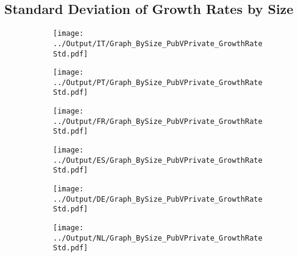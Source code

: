\documentclass[12pt,notitlepage]{article}
\begin{document}
\subsection{Standard Deviation of Growth Rates by Size}
\begin{figure}[!htpb]
\centering
\begin{subfigure}{.49\textwidth}
    \centering
 \texttt{[image: ../Output/IT/Graph\_BySize\_PubVPrivate\_GrowthRateStd.pdf]}
\end{subfigure}%
\begin{subfigure}{.49\textwidth}
    \centering
 \texttt{[image: ../Output/PT/Graph\_BySize\_PubVPrivate\_GrowthRateStd.pdf]}
\end{subfigure}
\begin{subfigure}{.49\textwidth}
    \centering
 \texttt{[image: ../Output/FR/Graph\_BySize\_PubVPrivate\_GrowthRateStd.pdf]}
\end{subfigure}%
\begin{subfigure}{.49\textwidth}
    \centering
 \texttt{[image: ../Output/ES/Graph\_BySize\_PubVPrivate\_GrowthRateStd.pdf]}
\end{subfigure}
\begin{subfigure}{.49\textwidth}
    \centering
 \texttt{[image: ../Output/DE/Graph\_BySize\_PubVPrivate\_GrowthRateStd.pdf]}
\end{subfigure}
\begin{subfigure}{.49\textwidth}
    \centering
 \texttt{[image: ../Output/NL/Graph\_BySize\_PubVPrivate\_GrowthRateStd.pdf]}
\end{subfigure}
\end{figure}
\end{document}
